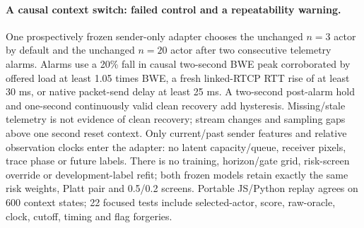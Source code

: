\documentclass[10pt]{article}
\begin{document}
\paragraph{A causal context switch: failed control and a repeatability warning.}
One prospectively frozen sender-only adapter chooses the unchanged $n=3$ actor by default and the unchanged $n=20$ actor after two consecutive telemetry alarms. Alarms use a 20\% fall in causal two-second BWE peak corroborated by offered load at least 1.05 times BWE, a fresh linked-RTCP RTT rise of at least 30 ms, or native packet-send delay at least 25 ms. A two-second post-alarm hold and one-second continuously valid clean recovery add hysteresis. Missing/stale telemetry is not evidence of clean recovery; stream changes and sampling gaps above one second reset context. Only current/past sender features and relative observation clocks enter the adapter: no latent capacity/queue, receiver pixels, trace phase or future labels. There is no training, horizon/gate grid, risk-screen override or development-label refit; both frozen models retain exactly the same risk weights, Platt pair and 0.5/0.2 screens. Portable JS/Python replay agrees on 600 context states; 22 focused tests include selected-actor, score, raw-oracle, clock, cutoff, timing and flag forgeries.
\end{document}
